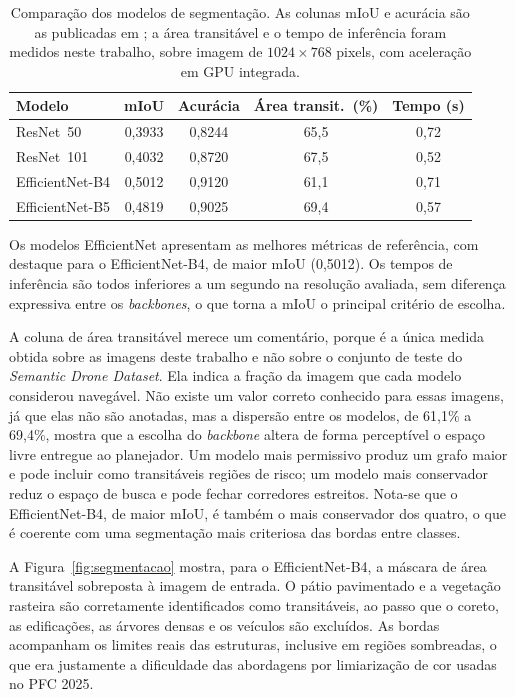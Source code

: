 \documentclass[
    12pt,
    openright,
    oneside,
    a4paper,
    english,
    brazil
]{abntex2}
\begin{document}
\begin{table}[H]
    \centering
    \caption{Comparação dos modelos de segmentação. As colunas mIoU e acurácia são as publicadas em \cite{junior2024_models}; a área transitável e o tempo de inferência foram medidos neste trabalho, sobre imagem de $1024 \times 768$ pixels, com aceleração em GPU integrada.}
    \label{tab:comparacao_modelos}
    \begin{tabular}{lcccc}
        \toprule
        \textbf{Modelo} & \textbf{mIoU} & \textbf{Acurácia} & \textbf{Área transit.\ (\%)} & \textbf{Tempo (s)} \\
        \midrule
        ResNet~50        & 0,3933 & 0,8244 & 65,5 & 0,72 \\
        ResNet~101       & 0,4032 & 0,8720 & 67,5 & 0,52 \\
        EfficientNet-B4  & 0,5012 & 0,9120 & 61,1 & 0,71 \\
        EfficientNet-B5  & 0,4819 & 0,9025 & 69,4 & 0,57 \\
        \bottomrule
    \end{tabular}
\end{table}

Os modelos EfficientNet apresentam as melhores métricas de referência, com destaque para o EfficientNet-B4, de maior mIoU (0,5012). Os tempos de inferência são todos inferiores a um segundo na resolução avaliada, sem diferença expressiva entre os \textit{backbones}, o que torna a mIoU o principal critério de escolha.

A coluna de área transitável merece um comentário, porque é a única medida obtida sobre as imagens deste trabalho e não sobre o conjunto de teste do \emph{Semantic Drone Dataset}. Ela indica a fração da imagem que cada modelo considerou navegável. Não existe um valor correto conhecido para essas imagens, já que elas não são anotadas, mas a dispersão entre os modelos, de 61,1\% a 69,4\%, mostra que a escolha do \textit{backbone} altera de forma perceptível o espaço livre entregue ao planejador. Um modelo mais permissivo produz um grafo maior e pode incluir como transitáveis regiões de risco; um modelo mais conservador reduz o espaço de busca e pode fechar corredores estreitos. Nota-se que o EfficientNet-B4, de maior mIoU, é também o mais conservador dos quatro, o que é coerente com uma segmentação mais criteriosa das bordas entre classes.

A Figura~\ref{fig:segmentacao} mostra, para o EfficientNet-B4, a máscara de área transitável sobreposta à imagem de entrada. O pátio pavimentado e a vegetação rasteira são corretamente identificados como transitáveis, ao passo que o coreto, as edificações, as árvores densas e os veículos são excluídos. As bordas acompanham os limites reais das estruturas, inclusive em regiões sombreadas, o que era justamente a dificuldade das abordagens por limiarização de cor usadas no PFC 2025.
\end{document}
